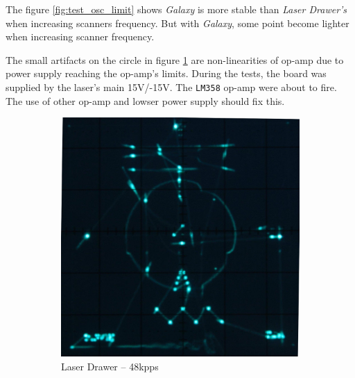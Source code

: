 \begin{en}
The figure \ref{fig:test_osc_limit} shows \textit{Galaxy} is more stable than \textit{Laser Drawer's} when increasing scanners frequency.
But with \textit{Galaxy}, some point become lighter when increasing scanner frequency.

The small artifacts on the circle in figure  \ref{fig:custom_48k} are non-linearities of op-amp due to power supply reaching the op-amp's limits.
During the tests, the board was supplied by the laser's main 15\unit{V}/-15\unit{V}.
The \texttt{LM358} op-amp were about to fire.
The use of other op-amp and lowser power supply should fix this.
\end{en}



\begin{figure}[ht]
	\begin{bigcenter}
        \begin{subfigure}[b]{0.5\textwidth}
                \includegraphics[width=\textwidth]{images/comp/custom_40k.jpg}
                \caption{Laser Drawer -- 48\unit{kpps}}
                \label{fig:custom_48k}
        \end{subfigure}
        \begin{subfigure}[b]{0.5\textwidth}

\end{subfigure}
\end{bigcenter}
\end{figure}
